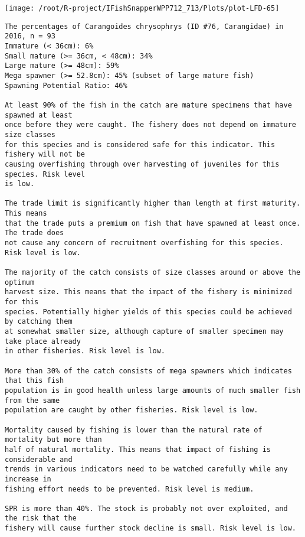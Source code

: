 \documentclass{report}\usepackage[]{graphicx}\usepackage[]{color}
\makeatletter
\def\maxwidth{ %
  \ifdim\Gin@nat@width>\linewidth
    \linewidth
  \else
    \Gin@nat@width
  \fi
}
\newenvironment{kframe}{%
 \def\at@end@of@kframe{}%
 \ifinner\ifhmode%
  \def\at@end@of@kframe{\end{minipage}}%
  \begin{minipage}{\columnwidth}%
 \fi\fi%
 \def\FrameCommand##1{\hskip\@totalleftmargin \hskip-\fboxsep
 \colorbox{shadecolor}{##1}\hskip-\fboxsep
     \hskip-\linewidth \hskip-\@totalleftmargin \hskip\columnwidth}%
 \MakeFramed {\advance\hsize-\width
   \@totalleftmargin\z@ \linewidth\hsize
   \@setminipage}}%
 {\par\unskip\endMakeFramed%
 \at@end@of@kframe}
\newenvironment{knitrout}{}{} %
\makeatother
\begin{document}
\begin{knitrout}
\texttt{[image: /root/R-project/IFishSnapperWPP712\_713/Plots/plot-LFD-65]} 
\begin{kframe}\begin{verbatim}
The percentages of Carangoides chrysophrys (ID #76, Carangidae) in 2016, n = 93
Immature (< 36cm): 6%
Small mature (>= 36cm, < 48cm): 34%
Large mature (>= 48cm): 59%
Mega spawner (>= 52.8cm): 45% (subset of large mature fish)
Spawning Potential Ratio: 46%
 
At least 90% of the fish in the catch are mature specimens that have spawned at least
once before they were caught. The fishery does not depend on immature size classes
for this species and is considered safe for this indicator. This fishery will not be
causing overfishing through over harvesting of juveniles for this species. Risk level
is low.

The trade limit is significantly higher than length at first maturity.  This means
that the trade puts a premium on fish that have spawned at least once. The trade does
not cause any concern of recruitment overfishing for this species. Risk level is low.

The majority of the catch consists of size classes around or above the optimum
harvest size. This means that the impact of the fishery is minimized for this
species. Potentially higher yields of this species could be achieved by catching them
at somewhat smaller size, although capture of smaller specimen may take place already
in other fisheries. Risk level is low.

More than 30% of the catch consists of mega spawners which indicates that this fish
population is in good health unless large amounts of much smaller fish from the same
population are caught by other fisheries. Risk level is low.
 
Mortality caused by fishing is lower than the natural rate of mortality but more than
half of natural mortality. This means that impact of fishing is considerable and
trends in various indicators need to be watched carefully while any increase in
fishing effort needs to be prevented. Risk level is medium.
 
SPR is more than 40%. The stock is probably not over exploited, and the risk that the
fishery will cause further stock decline is small. Risk level is low.
 

\end{verbatim}
\end{kframe}
\end{knitrout}
\end{document}
